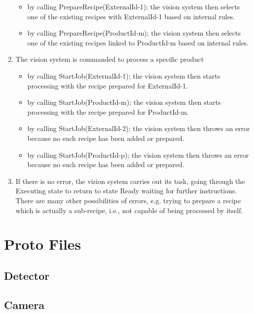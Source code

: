 \begin{enumerate}
\begin{itemize}
    \item by calling PrepareRecipe(ExternalId-1); the vision system then selects one of the existing recipes with 
    ExternalId-1 based on internal rules.
    \item by calling PrepareRecipe(ProductId-m); the vision system then selects one of the existing recipes 
    linked to ProductId-m based on internal rules. 
    \end{itemize}
    \item The vision system is commanded to process a specific product
    \begin{itemize}
        \item by calling StartJob(ExternalId-1); the vision system then starts processing with the recipe prepared for ExternalId-1. 
        \item by calling StartJob(ProductId-m); the vision system then starts processing with the recipe prepared for ProductId-m. 
        \item by calling StartJob(ExternalId-2); the vision system then throws an error because no such recipe has 
        been added or prepared.
        \item by calling StartJob(ProductId-p); the vision system then throws an error because no such recipe has 
        been added or prepared. 
    \end{itemize}
    \item If there is no error, the vision system carries out its task, going through the Executing state to return to state Ready waiting for further instructions. There are many other possibilities of errors, e.g. trying to prepare a recipe which is actually a sub-recipe, i.e., not capable of being processed by itself. 
\end{enumerate}


\chapter{Proto Files}
\label{proto}
\section{Detector}


\section{Camera}


\endinput
